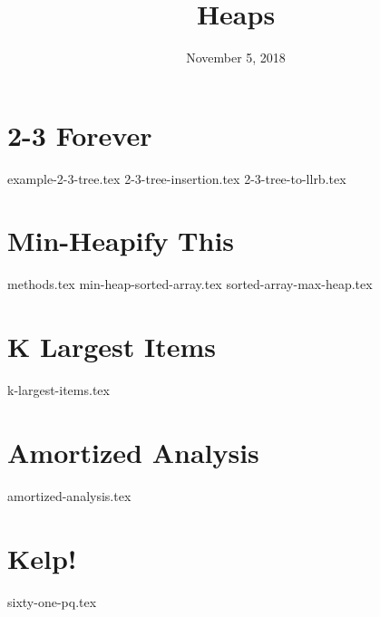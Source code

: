 \documentclass[11pt]{exam}
\title{Heaps}
\date{November 5, 2018}
\begin{document}
\maketitle

\section{2-3 Forever}
\begin{questions}
{example-2-3-tree.tex}
{2-3-tree-insertion.tex}
{2-3-tree-to-llrb.tex}
\end{questions}

\section{Min-Heapify This}
\begin{questions}
{methods.tex}
{min-heap-sorted-array.tex}
{sorted-array-max-heap.tex}
\end{questions}

\section{K Largest Items}
\begin{questions}
{k-largest-items.tex}
\end{questions}

\section{Amortized Analysis}
\begin{questions}
{amortized-analysis.tex}
\end{questions}

\section{Kelp!}
\begin{questions}
{sixty-one-pq.tex}
\end{questions}
\end{document}
